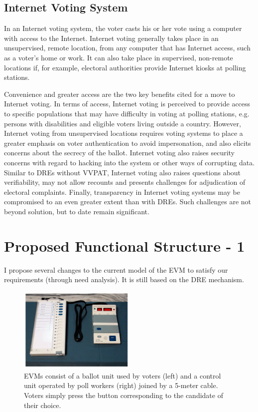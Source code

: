 \documentclass{article}
\begin{document}
\subsection{Internet Voting System}
In an Internet voting system, the voter casts his or her vote using a computer with access to the Internet. Internet voting generally takes place in an unsupervised, remote location, from any computer that has Internet access, such as a voter’s home or work. It can also take place in supervised, non-remote locations if, for example, electoral authorities provide Internet kiosks at polling stations. \par
Convenience and greater access are the two key benefits cited for a move to Internet voting. In terms of access, Internet voting is perceived to provide access to specific populations that may have difficulty in voting at polling stations, e.g. persons with disabilities and eligible voters living outside a country. However, Internet voting from unsupervised locations requires voting systems to place a greater emphasis on voter authentication to avoid impersonation, and also elicits concerns about the secrecy of the ballot. Internet voting also raises security concerns with regard to hacking into the system or other ways of corrupting data. Similar to DREs without VVPAT, Internet voting also raises questions about verifiability, may not allow recounts and presents challenges for adjudication of electoral complaints. Finally, transparency in Internet voting systems may be compromised to an even greater extent than with DREs. Such challenges are not beyond solution, but to date remain significant.


\section{Proposed Functional Structure - 1}

I propose several changes to the current model of the EVM to satisfy our requirements (through need analysis). It is still based on the DRE mechanism.

\begin{figure}[h!]
\includegraphics[width=0.5\textwidth]{evm1.png}
\centering
\caption{EVMs consist of a ballot unit used by voters (left) and a control unit operated by poll workers (right) joined by a 5-meter cable. Voters simply press the button corresponding to the candidate of their choice.}
\end{figure}
\end{document}
